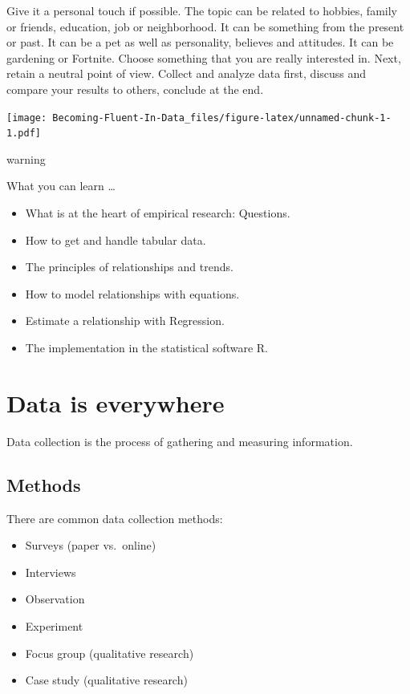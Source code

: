 \documentclass[
]{book}
\providecommand{\tightlist}{%
  \setlength{\itemsep}{0pt}\setlength{\parskip}{0pt}}
\begin{document}
Give it a personal touch if possible. The topic can be related to hobbies, family or friends, education, job or neighborhood. It can be something from the present or past. It can be a pet as well as personality, believes and attitudes. It can be gardening or Fortnite. Choose something that you are really interested in. Next, retain a neutral point of view. Collect and analyze data first, discuss and compare your results to others, conclude at the end.

\texttt{[image: Becoming-Fluent-In-Data\_files/figure-latex/unnamed-chunk-1-1.pdf]}

\begin{infobox}warning

What you can learn \ldots{}

\begin{itemize}
\tightlist
\item
  What is at the heart of empirical research: Questions.
\item
  How to get and handle tabular data.
\item
  The principles of relationships and trends.
\item
  How to model relationships with equations.
\item
  Estimate a relationship with Regression.
\item
  The implementation in the statistical software R.
\end{itemize}

\end{infobox}

\hypertarget{data-is-everywhere}{%
\chapter*{Data is everywhere}\label{data-is-everywhere}}

Data collection is the process of gathering and measuring information.

\hypertarget{methods}{%
\section*{Methods}\label{methods}}

There are common data collection methods:

\begin{itemize}
\tightlist
\item
  Surveys (paper vs.~online)
\item
  Interviews
\item
  Observation
\item
  Experiment
\item
  Focus group (qualitative research)
\item
  Case study (qualitative research)
\end{itemize}
\end{document}

